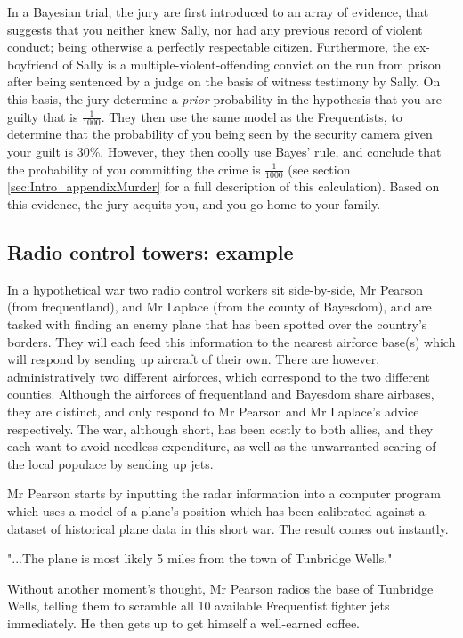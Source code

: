 \documentclass[11pt,fullpage]{book}
\begin{document}
In a Bayesian trial, the jury are first introduced to an array of evidence, that suggests that you neither knew Sally, nor had any previous record of violent conduct; being otherwise a perfectly respectable citizen. Furthermore, the ex-boyfriend of Sally is a multiple-violent-offending convict on the run from prison after being sentenced by a judge on the basis of witness testimony by Sally. On this basis, the jury determine a \textit{prior} probability in the hypothesis that you are guilty that is $\frac{1}{1000}$. They then use the same model as the Frequentists, to determine that the probability of you being seen by the security camera given your guilt is 30\%. However, they then coolly use Bayes' rule, and conclude that the probability of you committing the crime is $\frac{1}{1000}$ (see section \ref{sec:Intro_appendixMurder} for a full description of this calculation). Based on this evidence, the jury acquits you, and you go home to your family.

\subsection{Radio control towers: example}
In a hypothetical war two radio control workers sit side-by-side, Mr Pearson (from frequentland), and Mr Laplace (from the county of Bayesdom), and are tasked with finding an enemy plane that has been spotted over the country's borders. They will each feed this information to the nearest airforce base(s) which will respond by sending up aircraft of their own. There are however, administratively two different airforces, which correspond to the two different counties. Although the airforces of frequentland and Bayesdom share airbases, they are distinct, and only respond to Mr Pearson and Mr Laplace's advice respectively. The war, although short, has been costly to both allies, and they each want to avoid needless expenditure, as well as the unwarranted scaring of the local populace by sending up jets.

Mr Pearson starts by inputting the radar information into a computer program which uses a model of a plane's position which has been calibrated against a dataset of historical plane data in this short war. The result comes out instantly. 

"...The plane is most likely 5 miles from the town of Tunbridge Wells."

Without another moment's thought, Mr Pearson radios the base of Tunbridge Wells, telling them to scramble all 10 available Frequentist fighter jets immediately. He then gets up to get himself a well-earned coffee.
\end{document}
